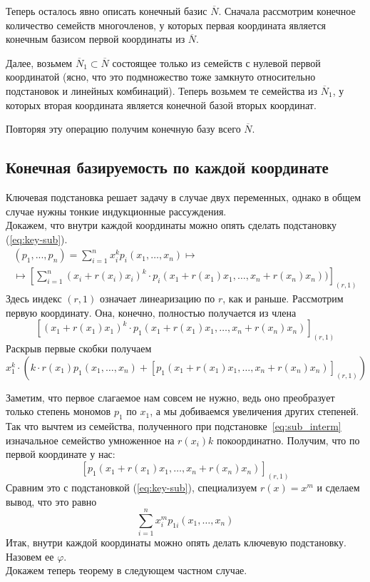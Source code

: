 Теперь осталось явно описать конечный базис $\overline{N}$.
Сначала рассмотрим конечное количество семейств многочленов, у которых первая координата является конечным базисом первой координаты из $\overline{N}$.

Далее, возьмем $\overline{N}_1\subset \overline{N}$ состоящее только из семейств с нулевой первой координатой (ясно, что это подмножество тоже замкнуто относительно подстановок и линейных комбинаций).
Теперь возьмем те семейства из $\overline{N}_1$, у которых вторая координата является конечной базой вторых координат.

Повторяя эту операцию получим конечную базу всего $\overline{N}$.

\subsection{Конечная базируемость по каждой координате}\label{subsec:local}
Ключевая подстановка решает задачу в случае двух переменных, однако в общем случае нужны тонкие индукционные рассуждения.\\
Докажем, что внутри каждой координаты можно опять сделать подстановку (\ref{eq:key-sub}).
\begin{multline*}
(p_1,...,p_n)
    =\sum\limits_{i=1}^n x^k_i p_i(x_1,\ldots,x_n)\mapsto\\\mapsto [\sum\limits_{i=1}^n (x_i+r(x_i)x_i)^k\cdot p_i(x_1+r(x_1)x_1,\ldots,x_n+r(x_n)x_n))]_{(r,1)}
\end{multline*}Здесь индекс $(r,1)$ означает линеаризацию по $r$, как и раньше.
Рассмотрим первую координату.
Она, конечно, полностью получается из члена
\[[(x_1+r(x_1)x_1)^k\cdot p_1(x_1+r(x_1)x_1,\ldots,x_n+r(x_n)x_n)]_{(r,1)}\]Раскрыв первые скобки получаем
\begin{equation}
    \label{eq:sub_interm}
    x_1^k\cdot(k\cdot r(x_1) p_1(x_1,\ldots,x_n)+ [p_1(x_1+r(x_1)x_1,\ldots,x_n+r(x_n)x_n)]_{(r,1)})
\end{equation}

Заметим, что первое слагаемое нам совсем не нужно, ведь оно преобразует только степень мономов $p_1$ по $x_1$, а мы добиваемся увеличения других степеней.
Так что вычтем из семейства, полученного при подстановке~\eqref{eq:sub_interm} изначальное семейство умноженное на $r(x_i)k$ покоординатно.
Получим, что по первой координате у нас:
\[[p_1(x_1+r(x_1)x_1,\ldots,x_n+r(x_n)x_n)]_{(r,1)}\]Сравним это с подстановкой (\ref{eq:key-sub}), специализуем $r(x)=x^m$ и сделаем вывод, что это равно
\begin{equation}
    \label{eq:key_inside}
    \sum\limits_{i=1}^n x_i^m p_{1i}(x_1,\ldots,x_n)
\end{equation}
Итак, внутри каждой координаты можно опять делать ключевую подстановку.
Назовем ее $\varphi$.\\
Докажем теперь теорему в следующем частном случае.

